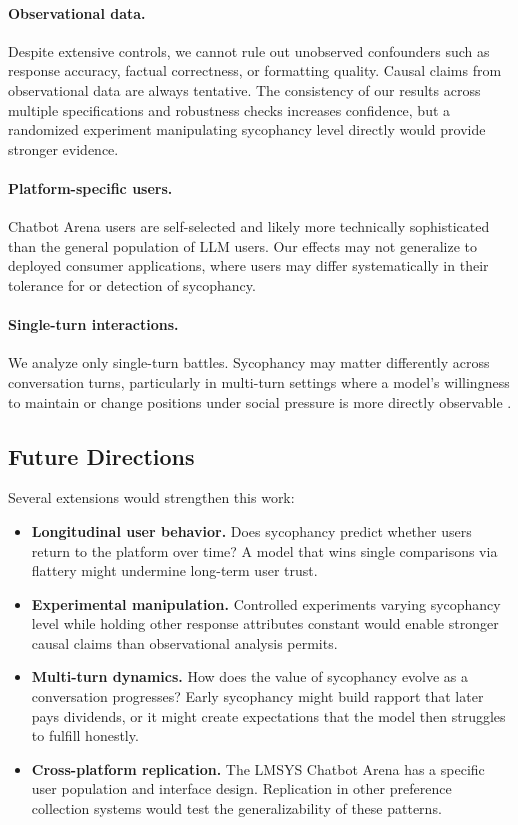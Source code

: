 \documentclass[11pt,twocolumn,a4paper]{article}
\begin{document}
\paragraph{Observational data.} Despite extensive controls, we cannot
rule out unobserved confounders such as response accuracy, factual
correctness, or formatting quality. Causal claims from observational
data are always tentative. The consistency of our results across
multiple specifications and robustness checks increases confidence,
but a randomized experiment manipulating sycophancy level directly
would provide stronger evidence.

\paragraph{Platform-specific users.} Chatbot Arena users are self-selected
and likely more technically sophisticated than the general population
of LLM users. Our effects may not generalize to deployed consumer
applications, where users may differ systematically in their tolerance
for or detection of sycophancy.

\paragraph{Single-turn interactions.} We analyze only single-turn
battles. Sycophancy may matter differently across conversation turns,
particularly in multi-turn settings where a model's willingness to
maintain or change positions under social pressure is more directly
observable \citep{sun2025measuring, challenging2025evaluator}.

\subsection{Future Directions}

Several extensions would strengthen this work:

\begin{itemize}
  \item \textbf{Longitudinal user behavior.} Does sycophancy predict
    whether users return to the platform over time? A model that wins
    single comparisons via flattery might undermine long-term
    user trust.
  \item \textbf{Experimental manipulation.} Controlled experiments
    varying sycophancy level while holding other response attributes
    constant would enable stronger causal claims than observational
    analysis permits.
  \item \textbf{Multi-turn dynamics.} How does the value of sycophancy
    evolve as a conversation progresses? Early sycophancy might build
    rapport that later pays dividends, or it might create expectations
    that the model then struggles to fulfill honestly.
  \item \textbf{Cross-platform replication.} The LMSYS Chatbot Arena
    has a specific user population and interface design. Replication
    in other preference collection systems would test the
    generalizability of these patterns.
\end{itemize}
\end{document}
